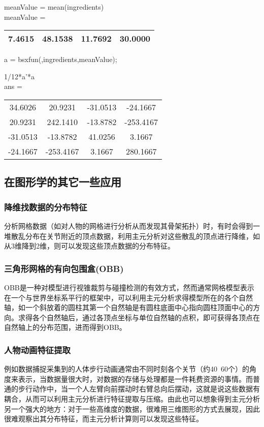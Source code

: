 \begin{frame}
 meanValue = mean(ingredients)\\

meanValue =\\
\begin{table}
\begin{tabular}{|c|c|c|c|}
\hline
  \rowcolor{blue!50}  7.4615 &  48.1538 &  11.7692  & 30.0000\\
  \hline
  \end{tabular}
  \end{table}

 a = bsxfun(\@minus,ingredients,meanValue);

1/12*a'*a\\
ans =
\begin{table}
\begin{tabular}{|c|c|c|c|}
\hline
   34.6026 &  20.9231 & -31.0513&  -24.1667\\
   20.9231&  242.1410  &-13.8782& -253.4167\\
  -31.0513  &-13.8782  & 41.0256 &   3.1667\\
  -24.1667 &-253.4167 &   3.1667 & 280.1667\\
    \hline
  \end{tabular}
  \end{table}
 \end{frame} 

\subsection{在图形学的其它一些应用}
\begin{frame}
\frametitle{降维找数据的分布特征}
分析网格数据（如对人物的网格进行分析从而发现其骨架拓扑）时，有时会得到一堆散乱分布在关节附近的顶点数据，利用主元分析对这些散乱的顶点进行降维，如从3维降到2维，则可以发现这些顶点数据的分布特征。\\

\end{frame}

  
\begin{frame}
\frametitle{三角形网格的有向包围盒(OBB)}
OBB是一种对模型进行视锥裁剪与碰撞检测的有效方式，然而通常网格模型表示在一个与世界坐标系平行的框架中，可以利用主元分析求得模型所在的各个自然轴，如一个斜放着的圆柱其第一个自然轴是有圆柱底面中心指向圆柱顶面中心的方向。求得各个自然轴后，通过各顶点坐标与单位自然轴的点积，即可获得各顶点在自然轴上的分布范围，进而得到OBB。
\end{frame}
\begin{frame}
\frametitle{人物动画特征提取}
例如数据捕捉采集到的人体步行动画通常由不同时刻各个关节（约40~60个）的角度来表示，当数据量很大时，对数据的存储与处理都是一件耗费资源的事情。而普通的步行动作中，当一个人左臂向前摆动时右臂总向后摆动，这就是说这些数据有耦合，从而可以利用主元分析进行特征提取与压缩。由此也可以想象得到主元分析另一个强大的地方：对于一些高维度的数据，很难用三维图形的方式去展现，因此很难观察出其分布特征，而主元分析计算则可以发现这些特征。
\end{frame}






